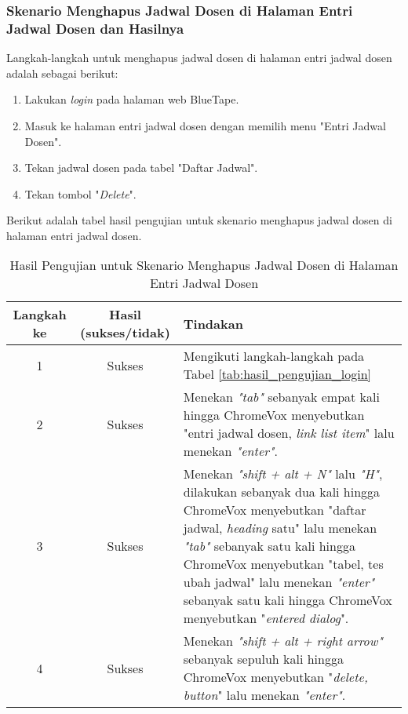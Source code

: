 \subsubsection{Skenario Menghapus Jadwal Dosen di Halaman Entri Jadwal Dosen dan Hasilnya}
\label{subsubsec:skenario_menghapus_jadwal_dosen_di_halaman_entri_jadwal_dosen}
Langkah-langkah untuk menghapus jadwal dosen di halaman entri jadwal dosen adalah sebagai berikut:

\begin{enumerate}
    \item Lakukan \textit{login} pada halaman web BlueTape.
    \item Masuk ke halaman entri jadwal dosen dengan memilih menu "Entri Jadwal Dosen".
    \item Tekan jadwal dosen pada tabel "Daftar Jadwal".
    \item Tekan tombol "\textit{Delete}".
\end{enumerate}

Berikut adalah tabel hasil pengujian untuk skenario menghapus jadwal dosen di halaman entri jadwal dosen.

\begin{table}[H]
    \centering 
    \caption{Hasil Pengujian untuk Skenario Menghapus Jadwal Dosen di Halaman Entri Jadwal Dosen}
    \label{tab:hasil_pengujian_menghapus_jadwal_dosen_di_halaman_entri_jadwal_dosen}
    \begin{tabular}{|c|c|p{10cm}|}
        \toprule
        Langkah ke & Hasil (sukses/tidak) & Tindakan \\

        \midrule
        1 & Sukses & Mengikuti langkah-langkah pada Tabel \ref{tab:hasil_pengujian_login} \\
        2 & Sukses & Menekan \textit{"tab"} sebanyak empat kali hingga ChromeVox menyebutkan "entri jadwal dosen, \textit{link list item}" lalu menekan \textit{"enter"}. \\
        3 & Sukses & Menekan \textit{"shift + alt + N"} lalu \textit{"H"}, dilakukan sebanyak dua kali hingga ChromeVox menyebutkan "daftar jadwal, \textit{heading} satu" lalu menekan \textit{"tab"} sebanyak satu kali hingga ChromeVox menyebutkan "tabel, tes ubah jadwal" lalu menekan \textit{"enter"} sebanyak satu kali hingga ChromeVox menyebutkan "\textit{entered dialog}". \\
        4 & Sukses & Menekan \textit{"shift + alt + right arrow"} sebanyak sepuluh kali hingga ChromeVox menyebutkan "\textit{delete, button}" lalu menekan \textit{"enter"}. \\

        \bottomrule

    \end{tabular}
\end{table}

